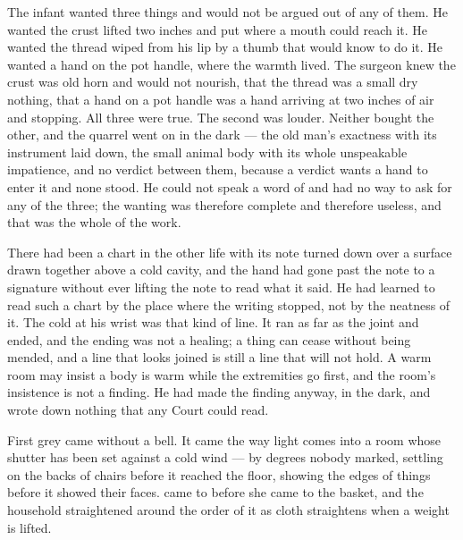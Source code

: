 The infant wanted three things and would not be argued out of any of them. He wanted the crust lifted two inches and put where a mouth could reach it. He wanted the thread wiped from his lip by a thumb that would know to do it. He wanted a hand on the pot handle, where the warmth lived. The surgeon knew the crust was old horn and would not nourish, that the thread was a small dry nothing, that a hand on a pot handle was a hand arriving at two inches of air and stopping. All three were true. The second was louder. Neither bought the other, and the quarrel went on in the dark --- the old man's exactness with its instrument laid down, the small animal body with its whole unspeakable impatience, and no verdict between them, because a verdict wants a hand to enter it and none stood. He could not speak a word of  and had no way to ask for any of the three; the wanting was therefore complete and therefore useless, and that was the whole of the work.

There had been a chart in the other life with its note turned down over a surface drawn together above a cold cavity, and the hand had gone past the note to a signature without ever lifting the note to read what it said. He had learned to read such a chart by the place where the writing stopped, not by the neatness of it. The cold at his wrist was that kind of line. It ran as far as the joint and ended, and the ending was not a healing; a thing can cease without being mended, and a line that looks joined is still a line that will not hold. A warm room may insist a body is warm while the extremities go first, and the room's insistence is not a finding. He had made the finding anyway, in the dark, and wrote down nothing that any Court could read.

\scenebreak

First grey came without a bell. It came the way light comes into a room whose shutter has been set against a cold wind --- by degrees nobody marked, settling on the backs of chairs before it reached the floor, showing the edges of things before it showed their faces.  came to  before she came to the basket, and the household straightened around the order of it as cloth straightens when a weight is lifted.

